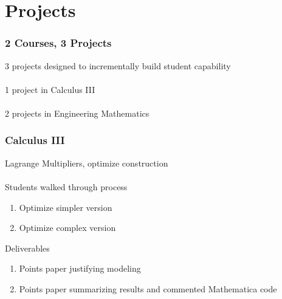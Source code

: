 \documentclass{beamer}
\begin{document}
\section{Projects}

\begin{frame}
\begin{center}
\frametitle{2 Courses, 3 Projects}

3 projects designed to incrementally build student capability\\

~\\

1 project in Calculus III\\

~\\

2 projects in Engineering Mathematics

\end{center}
\end{frame}


\begin{frame}
\begin{center}
\frametitle{Calculus III}

Lagrange Multipliers, optimize construction\\

~\\

Students walked through process

\begin{enumerate}

\item Optimize simpler version

\item Optimize complex version

\end{enumerate}

Deliverables

\begin{enumerate}

\item Points paper justifying modeling

\item Points paper summarizing results and commented Mathematica code

\end{enumerate}

\end{center}
\end{frame}
\end{document}
